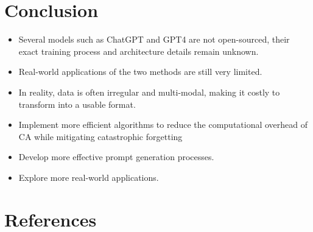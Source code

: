 \documentclass[t]{beamer}
\begin{document}
\section{Conclusion}
\begin{frame}{}
  \vspace{1cm}
  \begin{itemize}
    \item Several models such as ChatGPT and GPT4 are not open-sourced, their exact training process and architecture details remain unknown.
    \newline
    \item Real-world applications of the two methods are still very limited.
    \newline
    \item In reality, data is often irregular and multi-modal, making
    it costly to transform into a usable format.
    \newline
    \item Implement more efficient algorithms to reduce the computational overhead of CA while mitigating catastrophic forgetting
    \newline
    \item Develop more effective prompt generation processes.
    \newline
    \item Explore more real-world applications.
  \end{itemize}
\end{frame}

\section{References}
\end{document}

